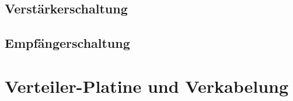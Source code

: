 

\subsection{Verstärkerschaltung}



\subsection{Empfängerschaltung}



\section{Verteiler-Platine und Verkabelung}

